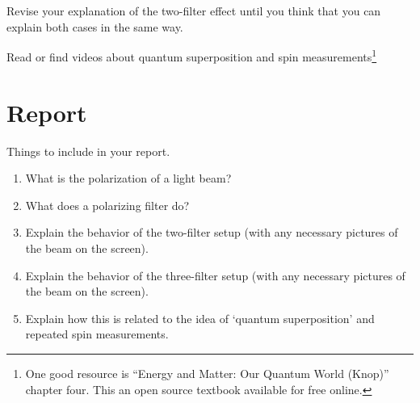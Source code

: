 \documentclass[phy1200]{handout}
\begin{document}
Revise your explanation of the two-filter effect until you think that you can explain both cases in the same way.

Read or find videos about quantum superposition and spin measurements\footnote{One good resource is ``Energy and Matter: Our Quantum World (Knop)'' chapter four. This an open source textbook available for free online. }

\section{Report}
Things to include in your report.
\begin{enumerate}
    \item What is the polarization of a light beam?
    \item What does a polarizing filter do?
    \item Explain the behavior of the two-filter setup (with any necessary pictures of the beam on the screen).
    \item Explain the behavior of the three-filter setup (with any necessary pictures of the beam on the screen).
    \item Explain how this is related to the idea of `quantum superposition' and repeated spin measurements.    
\end{enumerate}
\end{document}
